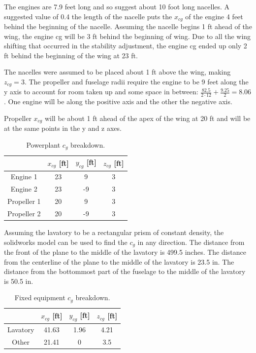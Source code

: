 \documentclass[conf]{new-aiaa}
\begin{document}
The engines are 7.9 feet long and so suggest about 10 foot long nacelles. A suggested value of 0.4 the length of the nacelle \cite{pres19} puts the $x_{cg}$ of the engine 4 feet behind the beginning of the nacelle. Assuming the nacelle begins 1 ft ahead of the wing, the engine cg will be 3 ft behind the beginning of wing. Due to all the wing shifting that occurred in the stability adjustment, the engine cg ended up only 2 ft behind the beginning of the wing at 23 ft. 

The nacelles were assumed to be placed about 1 ft above the wing, making $z_{cg} = 3$. The propeller and fuselage radii require the engine to be 9 feet along the y axis to account for room taken up and some space in between: $\frac{82.5}{2\cdot12}+\frac{9.25}{2}=8.06$. One engine will be along the positive axis and the other the negative axis.

Propeller $x_{cg}$ will be about 1 ft ahead of the apex of the wing at 20 ft and will be at the same points in the y and z axes.

\begin{table}[H]
\centering
\label{tab:Powerplant cg}
\caption{Powerplant $c_g$ breakdown.}
\begin{tabular}{|c|c|c|c|}\hline
	& $x_{cg}$ [ft] & $y_{cg}$ [ft] & $z_{cg}$ [ft] \\ \hline
Engine 1 & 23 & 9 & 3\\ \hline
Engine 2 & 23 & -9 & 3\\ \hline
Propeller 1 & 20 & 9 & 3 \\ \hline
Propeller 2 & 20 & -9 & 3\\ \hline
\end{tabular}
\end{table}

Assuming the lavatory to be a rectangular prism of constant density, the solidworks model can be used to find the $c_g$ in any direction. The distance from the front of the plane to the middle of the lavatory is 499.5 inches. The distance from the centerline of the plane to the middle of the lavatory is 23.5 in. The distance from the bottommost part of the fuselage to the middle of the lavatory is 50.5 in.

\begin{table}[H]
\centering
\label{tab:Fixed equipment cg}
\caption{Fixed equipment $c_g$ breakdown.}
\begin{tabular}{|c|c|c|c|}\hline
	& $x_{cg}$ [ft] & $y_{cg}$ [ft] & $z_{cg}$ [ft] \\ \hline
Lavatory & 41.63 & 1.96 & 4.21\\ \hline
Other & 21.41 & 0 & 3.5\\ \hline

\end{tabular}
\end{table}
\end{document}
